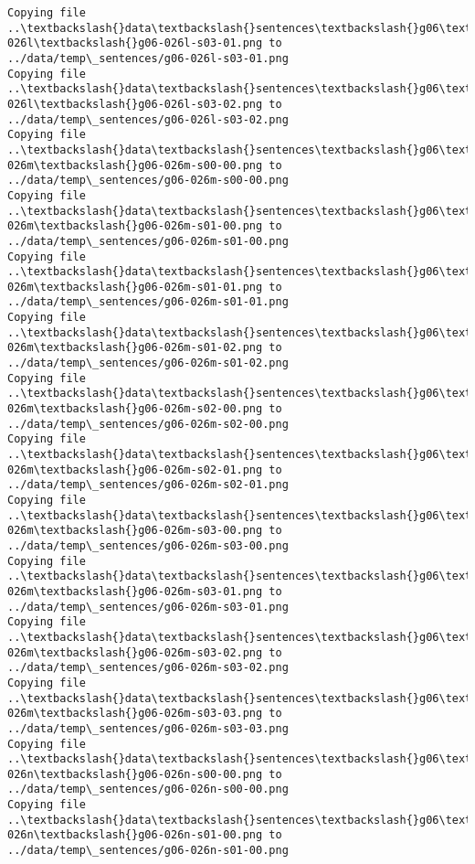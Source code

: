 \documentclass[11pt]{article}
\begin{document}
\begin{Verbatim}[commandchars=\\\{\}]
Copying file ..\textbackslash{}data\textbackslash{}sentences\textbackslash{}g06\textbackslash{}g06-026l\textbackslash{}g06-026l-s03-01.png to
../data/temp\_sentences/g06-026l-s03-01.png
Copying file ..\textbackslash{}data\textbackslash{}sentences\textbackslash{}g06\textbackslash{}g06-026l\textbackslash{}g06-026l-s03-02.png to
../data/temp\_sentences/g06-026l-s03-02.png
Copying file ..\textbackslash{}data\textbackslash{}sentences\textbackslash{}g06\textbackslash{}g06-026m\textbackslash{}g06-026m-s00-00.png to
../data/temp\_sentences/g06-026m-s00-00.png
Copying file ..\textbackslash{}data\textbackslash{}sentences\textbackslash{}g06\textbackslash{}g06-026m\textbackslash{}g06-026m-s01-00.png to
../data/temp\_sentences/g06-026m-s01-00.png
Copying file ..\textbackslash{}data\textbackslash{}sentences\textbackslash{}g06\textbackslash{}g06-026m\textbackslash{}g06-026m-s01-01.png to
../data/temp\_sentences/g06-026m-s01-01.png
Copying file ..\textbackslash{}data\textbackslash{}sentences\textbackslash{}g06\textbackslash{}g06-026m\textbackslash{}g06-026m-s01-02.png to
../data/temp\_sentences/g06-026m-s01-02.png
Copying file ..\textbackslash{}data\textbackslash{}sentences\textbackslash{}g06\textbackslash{}g06-026m\textbackslash{}g06-026m-s02-00.png to
../data/temp\_sentences/g06-026m-s02-00.png
Copying file ..\textbackslash{}data\textbackslash{}sentences\textbackslash{}g06\textbackslash{}g06-026m\textbackslash{}g06-026m-s02-01.png to
../data/temp\_sentences/g06-026m-s02-01.png
Copying file ..\textbackslash{}data\textbackslash{}sentences\textbackslash{}g06\textbackslash{}g06-026m\textbackslash{}g06-026m-s03-00.png to
../data/temp\_sentences/g06-026m-s03-00.png
Copying file ..\textbackslash{}data\textbackslash{}sentences\textbackslash{}g06\textbackslash{}g06-026m\textbackslash{}g06-026m-s03-01.png to
../data/temp\_sentences/g06-026m-s03-01.png
Copying file ..\textbackslash{}data\textbackslash{}sentences\textbackslash{}g06\textbackslash{}g06-026m\textbackslash{}g06-026m-s03-02.png to
../data/temp\_sentences/g06-026m-s03-02.png
Copying file ..\textbackslash{}data\textbackslash{}sentences\textbackslash{}g06\textbackslash{}g06-026m\textbackslash{}g06-026m-s03-03.png to
../data/temp\_sentences/g06-026m-s03-03.png
Copying file ..\textbackslash{}data\textbackslash{}sentences\textbackslash{}g06\textbackslash{}g06-026n\textbackslash{}g06-026n-s00-00.png to
../data/temp\_sentences/g06-026n-s00-00.png
Copying file ..\textbackslash{}data\textbackslash{}sentences\textbackslash{}g06\textbackslash{}g06-026n\textbackslash{}g06-026n-s01-00.png to
../data/temp\_sentences/g06-026n-s01-00.png

\end{Verbatim}
\end{document}
